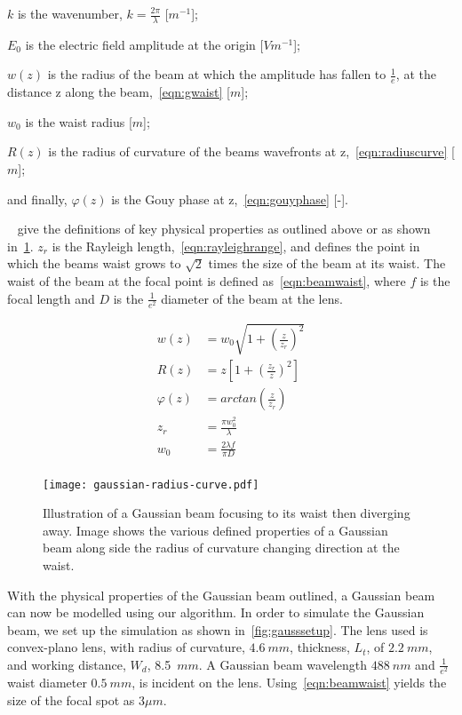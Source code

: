     \indent $k$ is the wavenumber, $k=\frac{2\pi}{\lambda}$ [$m^{-1}$];

    \indent $E_0$ is the electric field amplitude at the origin [$Vm^{-1}$];

    \indent $w(z)$ is the radius of the beam at which the amplitude has fallen to $\frac{1}{e}$, at the distance z along the beam,~\cref{eqn:gwaist} [$m$];

    \indent $w_0$ is the waist radius [$m$];

    \indent $R(z)$ is the radius of curvature of the beams wavefronts at z,~\cref{eqn:radiuscurve} [$m$];

    \indent and finally, $\varphi(z)$ is the Gouy phase at z,~\cref{eqn:gouyphase} [-].

\medskip

~ give the definitions of key physical properties as outlined above or as shown in~\cref{fig:gbeamills}. 
$z_r$ is the Rayleigh length,~\cref{eqn:rayleighrange}, and defines the point in which the beams waist grows to $\sqrt{2}$ times the size of the beam at its waist.
The waist of the beam at the focal point is defined as~\cref{eqn:beamwaist}, where $f$ is the focal length and $D$ is the $\tfrac{1}{e^2}$ diameter of the beam at the lens.

\begin{align}
    w(z) &= w_0\sqrt{1+\left(\frac{z}{z_r}\right)^2} \label{eqn:gwaist} \\
    R(z) &= z\left[1+\left(\frac{z_r}{z}\right)^2\right]\label{eqn:radiuscurve}\\
    \varphi(z) &= arctan\left(\frac{z}{z_r}\right)\label{eqn:gouyphase}\\
    z_r &= \frac{\pi w_0^2}{\lambda}\label{eqn:rayleighrange}\\
    w_0 &= \frac{2\lambda f}{\pi D}\label{eqn:beamwaist}\\
\end{align}

\begin{figure}[!ht]
    \centering
    \texttt{[image: gaussian-radius-curve.pdf]}
    \caption{Illustration of a Gaussian beam focusing to its waist then diverging away. Image shows the various defined properties of a Gaussian beam along side the radius of curvature changing direction at the waist.}
    \label{fig:gbeamills}
\end{figure}

With the physical properties of the Gaussian beam outlined, a Gaussian beam can now be modelled using our algorithm.
In order to simulate the Gaussian beam, we set up the simulation as shown in~\cref{fig:gausssetup}.
The lens used is convex-plano lens, with radius of curvature, $4.6~mm$, thickness, $L_t$, of $2.2~mm$, and working distance, $W_d$, 8.5~$mm$.
A Gaussian beam wavelength $488~nm$ and $\tfrac{1}{e^2}$ waist diameter $0.5~mm$, is incident on the lens.
Using~\cref{eqn:beamwaist} yields the size of the focal spot as $3\mu m$.

